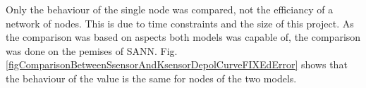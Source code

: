 Only the behaviour of the single node was compared, not the efficiancy of a network of nodes. 
This is due to time constraints and the size of this project.
As the comparison was based on aspects both models was capable of, the comparison was done on the pemises of SANN.
Fig. \ref{figComparisonBetweenSsensorAndKsensorDepolCurveFIXEdError} shows that the behaviour of the value is the same for nodes of the two models.

% 


